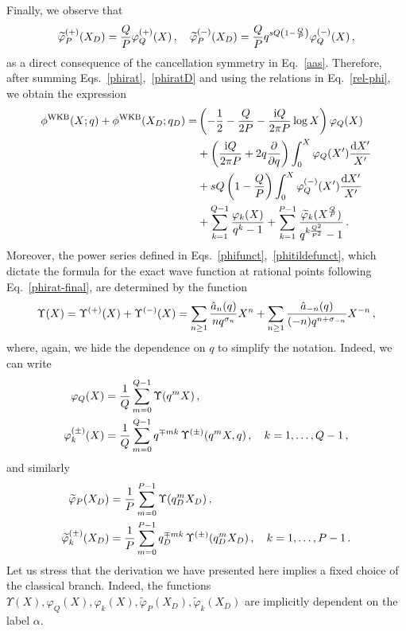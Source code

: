 \documentclass[a4paper,11pt]{article}
\theoremstyle{definition}
\newcommand{\ri}{{\rm i}}
\newcommand{\rd}{{\rm d}}
\newcommand{\be}{\begin{equation}}
\newcommand{\ee}{\end{equation}}
\newcommand{\ba}{\begin{aligned}}
\newcommand{\ea}{\end{aligned}}
\begin{document}
Finally, we observe that 
\be \label{rel-phi}
\widetilde \varphi^{(+)}_P(X_D)={Q \over P} \varphi^{(+)}_Q(X) \, , \quad  \widetilde \varphi^{(-)}_P(X_D)={Q \over P} q^{s Q \left( 1- \frac{Q}{P} \right)} \varphi^{(-)}_Q(X) \, ,
\ee
as a direct consequence of the cancellation symmetry in Eq.~\eqref{aas}. 
Therefore, after summing Eqs.~\eqref{phirat},~\eqref{phiratD} and using the relations in Eq.~\eqref{rel-phi}, we obtain the expression
\be \label{phirat-final}
\ba
\phi^{\rm WKB}(X;q)+ \phi^{\rm WKB}(X_D;q_D)= & \left( -{1 \over 2} - {Q \over 2 P} - {\ri Q \over 2 \pi P} \log X \right) \varphi_Q(X) \\
&+ \left( {\ri Q \over 2 \pi P} + 2 q {\partial \over \partial q} \right)\int_0^X \varphi_Q(X') {\rd X '\over X'} \\
&+ s Q \left( 1- \frac{Q}{P} \right) \int_0^X \varphi^{(-)}_Q(X') {\rd X '\over X'} \\
&+ \sum_{k=1}^{Q-1} { \varphi_k(X)\over q^k-1} + \sum_{k=1}^{P-1} { \widetilde \varphi_k(X^{Q \over P})\over q^{k{Q^2 \over P^2}}-1} \, .
\ea
\ee
%
Moreover, the power series defined in Eqs.~\eqref{phifunct},~\eqref{phitildefunct}, which dictate the formula for the exact wave function at rational points following Eq.~\eqref{phirat-final}, are determined by the function
\be \label{upsilon}
\Upsilon (X)=\Upsilon^{(+)} (X)+\Upsilon^{(-)} (X)=\sum_{n \ge 1} {\hat{a}_n (q) \over n q^{\sigma_n}} X^n + \sum_{n \ge 1} {\hat{a}_{-n} (q) \over (-n) q^{n+\sigma_{-n}}} X^{-n} \, ,
\ee
where, again, we hide the dependence on $q$ to simplify the notation. Indeed, we can write
%
\begin{subequations}
\begin{align}
\varphi_Q(X)&={1\over Q} \sum_{m=0}^{Q-1}  \Upsilon (q^m X)  \, , \label{varphiQ-U} \\
\varphi^{(\pm)}_k(X)&={1\over Q} \sum_{m=0}^{Q-1} q^{\mp m k} \, \Upsilon^{(\pm)} (q^m X,q) \, , \quad k=1, \dots, Q-1 \, , 
\end{align}
\end{subequations}
%
and similarly
\begin{subequations}
\begin{align}
\widetilde \varphi_P(X_D)&={1\over P} \sum_{m=0}^{P-1}  \Upsilon (q_D^m X_D)  \, , \\
\widetilde \varphi^{(\pm)}_k(X_D)&={1\over P} \sum_{m=0}^{P-1} q_D^{\mp m k} \, \Upsilon^{(\pm)} (q_D^m X_D) \, , \quad k=1, \dots, P-1 \, .
\end{align}
\end{subequations}
Let us stress that the derivation we have presented here implies a fixed choice of the classical branch. Indeed, the functions $\Upsilon (X), \varphi_Q(X), \varphi_k(X), \widetilde \varphi_P(X_D), \widetilde \varphi_k(X_D)$ are implicitly dependent on the label $\alpha$.
\end{document}
